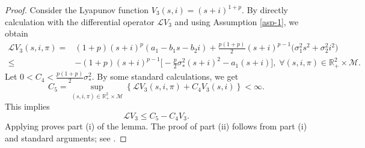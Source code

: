 \documentclass[12pt]{amsart}
\theoremstyle{remark}
\numberwithin{equation}{section}
\newcommand{\M}{\mathcal{M}}
\newcommand{\R}{\mathbb{R}}
\newcommand{\Lom}{\mathcal{L}}
\numberwithin{equation}{section}
\newcommand{\1}{\boldsymbol{1}}
\begin{document}
\begin{proof}
Consider the Lyapunov function
$V_3(s,i)=(s+i)^{1+p}.$
By directly calculation with
the differential operator $\Lom V_3$ and using Assumption \ref{asp-1}, we obtain
\begin{align*}
\Lom V_3(s,i,\pi)=&(1+p)(s+i)^p(a_1-b_1s-b_2i)
+\frac {p(1+p)}2(s+i)^{p-1}\Big( \sigma_1^2s^2+\sigma_2^2i^2\Big)\\
\leq &-(1+p)(s+i)^{p-1}\Big[ -\frac p2 \sigma_*^2(s+i)^2-a_1(s+i)\big],\;\forall (s,i,\pi)\in\R^2_+\times\M.
\end{align*}
Let
$0<C_4<\frac{p(1+p)}2\sigma_*^2$. By some standard calculations, we get
$$C_5=\sup_{(s,i,\pi)\in \R^2_+\times\M}\left\{\Lom V_3(s,i,\pi)+C_4V_3(s,i)\right\}<\infty.$$
This implies
\begin{equation}\label{10}
\Lom V_3\leq C_5-C_4 V_3.
\end{equation}
Applying \cite[Theorem 5.2, p.157]{MAO} proves part (i) of the lemma. The proof of part (ii) follows
from
part (i) and standard arguments;
see \cite[Lemma 2.1]{DN-JDE}.


\end{proof}
\end{document}
